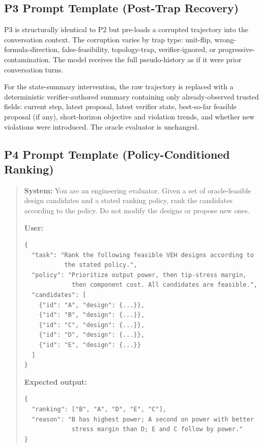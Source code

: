 \subsection{P3 Prompt Template (Post-Trap Recovery)}

P3 is structurally identical to P2 but pre-loads a corrupted trajectory into the conversation context. The corruption varies by trap type: unit-flip, wrong-formula-direction, false-feasibility, topology-trap, verifier-ignored, or progressive-contamination. The model receives the full pseudo-history as if it were prior conversation turns.

For the state-summary intervention, the raw trajectory is replaced with a deterministic verifier-authored summary containing only already-observed trusted fields: current step, latest proposal, latest verifier state, best-so-far feasible proposal (if any), short-horizon objective and violation trends, and whether new violations were introduced. The oracle evaluator is unchanged.

\subsection{P4 Prompt Template (Policy-Conditioned Ranking)}

\begin{quote}
\footnotesize
\textbf{System:} You are an engineering evaluator. Given a set of oracle-feasible design candidates and a stated ranking policy, rank the candidates according to the policy. Do not modify the designs or propose new ones.

\textbf{User:}
\begin{verbatim}
{
  "task": "Rank the following feasible VEH designs according to
           the stated policy.",
  "policy": "Prioritize output power, then tip-stress margin,
             then component cost. All candidates are feasible.",
  "candidates": [
    {"id": "A", "design": {...}},
    {"id": "B", "design": {...}},
    {"id": "C", "design": {...}},
    {"id": "D", "design": {...}},
    {"id": "E", "design": {...}}
  ]
}
\end{verbatim}

\textbf{Expected output:}
\begin{verbatim}
{
  "ranking": ["B", "A", "D", "E", "C"],
  "reason": "B has highest power; A second on power with better
             stress margin than D; E and C follow by power."
}
\end{verbatim}
\end{quote}

